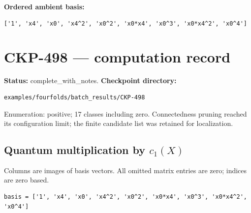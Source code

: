 \documentclass[10pt,a4paper]{article}
\begin{document}
\textbf{Ordered ambient basis:}
\begin{lstlisting}
['1', 'x4', 'x0', 'x4^2', 'x0^2', 'x0*x4', 'x0^3', 'x0*x4^2', 'x0^4']
\end{lstlisting}

\clearpage\section*{CKP-498 --- computation record}
\textbf{Status:} complete\_with\_notes.
\textbf{Checkpoint directory:}
\begin{lstlisting}
examples/fourfolds/batch_results/CKP-498
\end{lstlisting}

Enumeration: positive; 17 classes including zero.
Connectedness pruning reached its configuration limit; the finite candidate list was retained for localization.
\subsection*{Quantum multiplication by $c_1(X)$}
Columns are images of basis vectors. All omitted matrix entries are zero; indices are zero based.

\begin{lstlisting}
basis = ['1', 'x4', 'x0', 'x4^2', 'x0^2', 'x0*x4', 'x0^3', 'x0*x4^2', 'x0^4']
\end{lstlisting}
\end{document}
